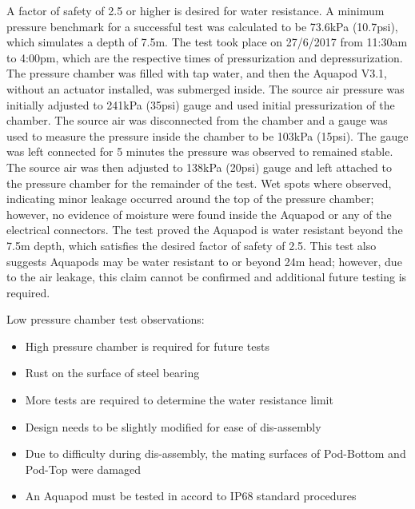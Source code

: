 A factor of safety of 2.5 or higher is desired for water resistance. A minimum pressure benchmark for a successful test was calculated to be 73.6kPa (10.7psi), which simulates a depth of 7.5m.
The test took place on 27/6/2017 from 11:30am to 4:00pm, which are the respective times of pressurization and depressurization.
The pressure chamber was filled with tap water, and then the Aquapod V3.1, without an actuator installed, was submerged inside.
The source air pressure was initially adjusted to 241kPa (35psi) gauge and used initial pressurization of the chamber.
The source air was disconnected from the chamber and a gauge was used to measure the pressure inside the chamber to be 103kPa (15psi). 
The gauge was left connected for 5 minutes the pressure was observed to remained stable. 
The source air was then adjusted to 138kPa (20psi) gauge and left attached to the pressure chamber for the remainder of the test. 
Wet spots where observed, indicating minor leakage occurred around the top of the pressure chamber; however, no evidence of moisture were found inside the Aquapod or any of the electrical connectors.
The test proved the Aquapod is water resistant beyond the 7.5m depth, which satisfies the desired factor of safety of 2.5.
This test also suggests Aquapods may be water resistant to or beyond 24m head; however, due to the air leakage, this claim cannot be confirmed and additional future testing is required.

Low pressure chamber test observations:
\begin{itemize}
    \item High pressure chamber is required for future tests
    
    \item Rust on the surface of steel bearing 
    
    \item More tests are required to determine the water resistance limit

    \item Design needs to be slightly modified for ease of dis-assembly

    \item Due to difficulty during dis-assembly, the mating surfaces of Pod-Bottom and Pod-Top were damaged
    
    \item An Aquapod must be tested in accord to IP68 standard procedures 
    
\end{itemize}

